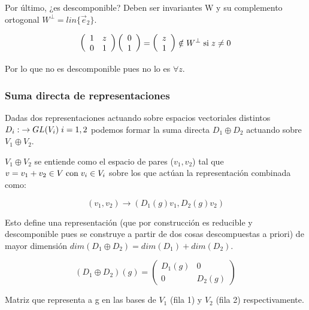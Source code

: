 \smallskip
Por último, ¿es descomponible? Deben ser invariantes W y su complemento ortogonal $W^\bot =lin \lbrace \Vec{e}_2 \rbrace$.

$$\left ( \begin{array}{cc}
1 & z \\
0 & 1
\end{array}\right) \left( \begin{array}{c}
0  \\
1
\end{array}\right)=  \left( \begin{array}{c}
z  \\
1
\end{array}\right) \notin W^\bot \hspace{0.1cm} \text{si} \hspace{0.1cm} z\neq 0$$


Por lo que no es descomponible pues no lo es $\forall z$.

\newpage
\subsubsection{Suma directa de representaciones}

Dadas dos representaciones actuando sobre espacios vectoriales distintos $D_i: \hspace{0.1cm} \to GL(V_i)\hspace{0.1cm} i=1,2$ podemos formar la suma directa $D_1\oplus D_2$ actuando sobre $V_1 \oplus V_2$.

$V_1 \oplus V_2$ se entiende como el espacio de pares ($v_1,v_2$) tal que $v=v_1+v_2 \in V \hspace{0.1cm} \text{con} \hspace{0.1cm} v_i\in V_i$ sobre los que actúan la representación combinada como:

$$(v_1,v_2)\to (D_1(g)v_1,D_2(g)v_2)$$

Esto define una representación (que por construcción es reducible y descomponible pues se construye a partir de dos cosas descompuestas a priori) de mayor dimensión $dim (D_1\oplus D_2)=dim (D_1)+dim (D_2)$.

$$(D_1 \oplus D_2)(g)=\left (\begin{array}{cc}
D_1(g) & 0 \\
0 & D_2(g)
\end{array} \right)$$

Matriz que representa a g en las bases de $V_1$ (fila 1) y $V_2$ (fila 2) respectivamente.

